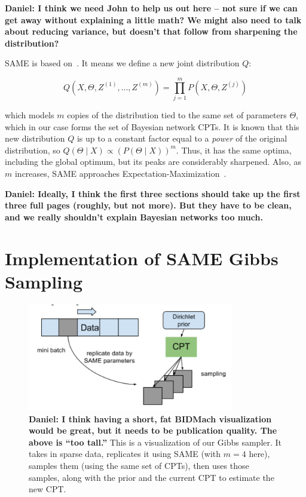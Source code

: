 \documentclass{article} %
\begin{document}
\textbf{Daniel: I think we need John to help us out here -- not sure if we can get away without
explaining a little math? We might also need to talk about reducing variance, but doesn't that
follow from sharpening the distribution?}

SAME is based on~\citep{SAME2002}. It means we define a new joint distribution $Q$:

\begin{equation}\label{eq:same}
Q(X,\Theta,Z^{(1)},\ldots,Z^{(m)}) = \prod_{j=1}^m P(X,\Theta,Z^{(j)})
\end{equation}

which models $m$ copies of the distribution tied to the same set of parameters $\Theta$, which in
our case forms the set of Bayesian network CPTs. It is known that this new distribution $Q$ is up to
a constant factor equal to a \emph{power} of the original distribution, so $Q(\Theta \mid X) \propto
(P(\Theta \mid X))^m$. Thus, it has the same optima, including the global optimum, but its peaks are
considerably sharpened. Also, as $m$ increases, SAME approaches
Expectation-Maximization~\citep{EMpaper}.

\textbf{Daniel: Ideally, I think the first three sections should take up the first three full pages
(roughly, but not more). But they have to be clean, and we really shouldn't explain Bayesian
networks too much.}




\section{Implementation of SAME Gibbs Sampling}\label{sec:implementation}

\begin{figure}[t]
\centering
\includegraphics[width=0.8\textwidth]{fig_BIDMach_flow_DRAFT}
\caption{\textbf{Daniel: I think having a short, fat BIDMach visualization would be great, but it needs
to be publication quality. The above is ``too tall.''} This is a visualization of our Gibbs sampler.
It takes in sparse data, replicates it using SAME (with $m=4$ here), samples them (using the same
set of CPTs), then uses those samples, along with the prior and the current CPT to estimate the new
CPT.}
\label{fig:BIDMach}
\end{figure}
\end{document}
